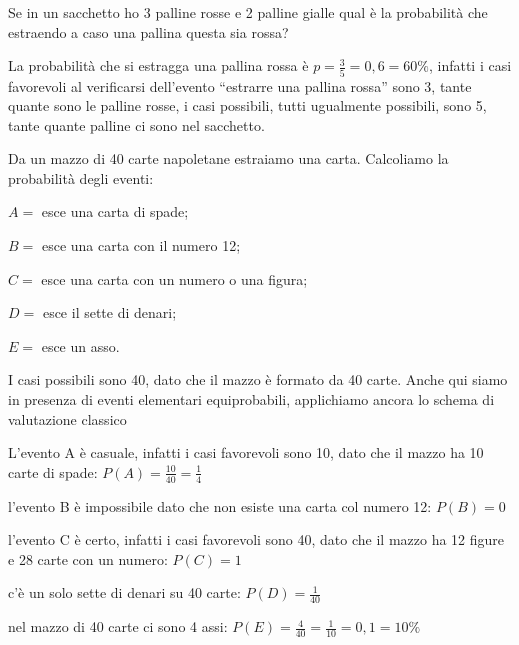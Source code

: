 \begin{esempio}
Se in un sacchetto ho 3 palline rosse e 2 palline gialle qual è la probabilità 
che estraendo a caso una pallina questa sia rossa?

La probabilità che si estragga una pallina rossa è $p=\frac 3 
5=0,6=60\text{\%}$, infatti i casi favorevoli al verificarsi dell'evento 
``estrarre una pallina rossa'' sono 3, tante quante sono le palline rosse, i 
casi possibili, tutti ugualmente possibili, sono 5, tante quante palline ci 
sono 
nel sacchetto.
\end{esempio}

\begin{esempio}
Da un mazzo di 40 carte napoletane estraiamo una carta. Calcoliamo la 
probabilità degli eventi:
\begin{itemize*}
\item $A=$ esce una carta di spade;
\item $B=$ esce una carta con il numero 12;
\item $C=$ esce una carta con un numero o una figura;
\item $D=$ esce il sette di denari;
\item $E=$ esce un asso.
\end{itemize*}
I casi possibili sono 40, dato che il mazzo è formato da 40 carte. Anche qui 
siamo in presenza di eventi elementari equiprobabili, applichiamo ancora lo 
schema di valutazione classico
\begin{itemize*}
\item L'evento A è casuale, infatti i casi favorevoli sono 10, dato che il 
mazzo 
ha 10 carte di spade: $P(A)=\frac{10}{40}=\frac 1 4$
\item l'evento B è impossibile dato che non esiste una carta col numero 12: $ 
P(B)=0 $
\item l'evento C è certo, infatti i casi favorevoli sono 40, dato che il mazzo 
ha 12 figure e 28 carte con un numero: $P(C)=1$
\item c'è un solo sette di denari su 40 carte: $P(D)=\frac 1{40}$
\item nel mazzo di 40 carte ci sono 4 assi: $P(E)=\frac 4{40}=\frac 
1{10}=0,1=10\%$
\end{itemize*}
\end{esempio}

